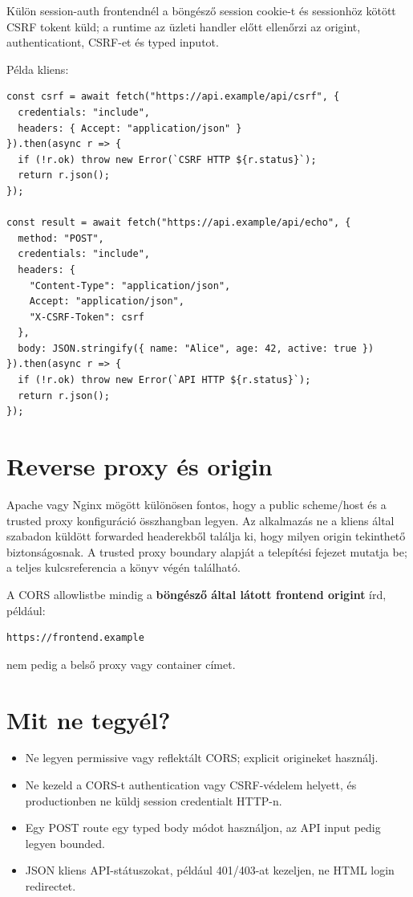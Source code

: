 Külön session-auth frontendnél a böngésző session cookie-t és sessionhöz kötött CSRF tokent küld; a runtime az üzleti handler előtt ellenőrzi az origint, authenticationt, CSRF-et és typed inputot.

Példa kliens:

\begin{lstlisting}
const csrf = await fetch("https://api.example/api/csrf", {
  credentials: "include",
  headers: { Accept: "application/json" }
}).then(async r => {
  if (!r.ok) throw new Error(`CSRF HTTP ${r.status}`);
  return r.json();
});

const result = await fetch("https://api.example/api/echo", {
  method: "POST",
  credentials: "include",
  headers: {
    "Content-Type": "application/json",
    Accept: "application/json",
    "X-CSRF-Token": csrf
  },
  body: JSON.stringify({ name: "Alice", age: 42, active: true })
}).then(async r => {
  if (!r.ok) throw new Error(`API HTTP ${r.status}`);
  return r.json();
});
\end{lstlisting}

\section{Reverse proxy és origin}

Apache vagy Nginx mögött különösen fontos, hogy a public scheme/host és a trusted proxy konfiguráció összhangban legyen. Az alkalmazás ne a kliens által szabadon küldött forwarded headerekből találja ki, hogy milyen origin tekinthető biztonságosnak. A trusted proxy boundary alapját a telepítési fejezet mutatja be; a teljes  kulcsreferencia a könyv végén található.

A CORS allowlistbe mindig a \textbf{böngésző által látott frontend origint} írd, például:

\begin{lstlisting}
https://frontend.example
\end{lstlisting}

nem pedig a belső proxy vagy container címet.

\section{Mit ne tegyél?}

\begin{itemize}
  \item Ne legyen permissive vagy reflektált CORS; explicit origineket használj.
  \item Ne kezeld a CORS-t authentication vagy CSRF-védelem helyett, és productionben ne küldj session credentialt HTTP-n.
  \item Egy POST route egy typed body módot használjon, az API input pedig legyen bounded.
  \item JSON kliens API-státuszokat, például 401/403-at kezeljen, ne HTML login redirectet.
\end{itemize}


